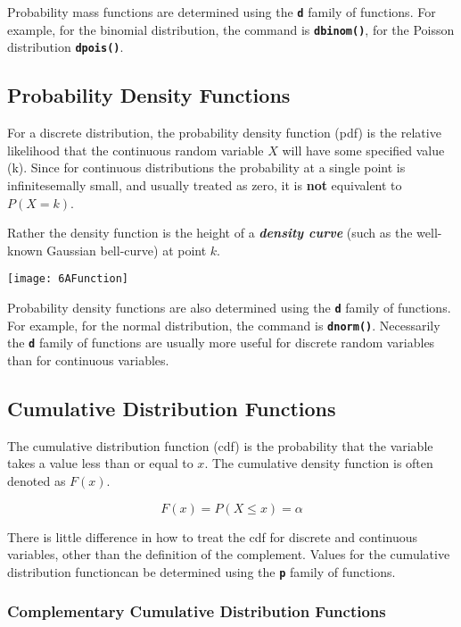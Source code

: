 \documentclass[a4paper,12pt]{article}
\begin{document}
Probability mass functions are determined using the \texttt{\textbf{d}} family of functions. For example, for the binomial distribution, the command is \texttt{\textbf{dbinom()}}, for the Poisson distribution \texttt{\textbf{dpois()}}. 

\subsection{Probability Density Functions} 
For a discrete distribution, the probability density function (pdf) is the relative likelihood that the continuous random variable $X$ will have some specified value (k).
Since for continuous distributions the probability at a single point is infinitesemally small, and usually treated as zero, it is \textbf{not} equivalent to $P(X = k)$.

Rather the density function is the height of a \textbf{\textit{density curve}} (such as the well-known Gaussian bell-curve) at point $k$.

\begin{center}
\texttt{[image: 6AFunction]}
\end{center}
 
 
Probability density functions are also determined using the \texttt{\textbf{d}} family of functions. For example, for the normal distribution, the command is \texttt{\textbf{dnorm()}}. 
Necessarily the  \texttt{\textbf{d}} family of functions are usually more useful for discrete random variables than for continuous variables.

\subsection{Cumulative Distribution Functions}

The cumulative distribution function (cdf) is the probability that the variable takes a value less than or equal to $x$. The cumulative density function is often denoted as $F(x)$.
 
 \[F(x)= P(X \leq x) = \alpha \]

There is little difference in how to treat the cdf for discrete and continuous variables, other than the definition of the complement.
Values for the cumulative distribution functioncan be determined using the \texttt{\textbf{p}} family of functions. 

\subsubsection{Complementary Cumulative Distribution Functions}
\end{document}
